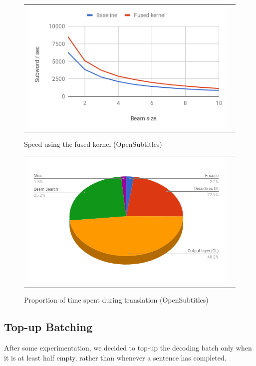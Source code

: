\documentclass[11pt,a4paper]{article}
\begin{document}
\begin{figure}
\centering
\begin{tabular}{cc}
{\includegraphics[scale=0.5]{beam-opensubtitles.png}} 
\end{tabular}
\caption{Speed using the fused kernel (OpenSubtitles)}
\label{fig:beam-opensubtitles}
\end{figure} 

\begin{figure}
\centering
\begin{tabular}{cc}
{\includegraphics[scale=0.3]{pie-time-opensubtitles.png}} 
\end{tabular}
\caption{Proportion of time spent during translation (OpenSubtitles)}
\label{fig:pie-time-opensubtitles}
\end{figure} 


\subsection{Top-up Batching}

After some experimentation, we decided to top-up the decoding batch only when it is at least half empty, rather than whenever a sentence has completed.
\end{document}
